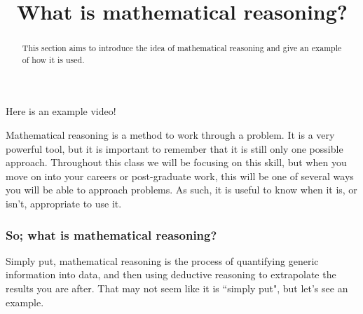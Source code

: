 \documentclass{ximera}
\title{What is mathematical reasoning?}
\begin{document}
\begin{abstract}
    This section aims to introduce the idea of mathematical reasoning and give an example of how it is used.
\end{abstract}
\maketitle

Here is an example video!


Mathematical reasoning is a method to work through a problem. It is a very powerful tool, but it is important to remember that it is still only one possible approach. Throughout this class we will be focusing on this skill, but when you move on into your careers or post-graduate work, this will be one of several ways you will be able to approach problems. As such, it is useful to know when it is, or isn't, appropriate to use it.


\subsubsection*{So; what is mathematical reasoning?}
    Simply put, mathematical reasoning is the process of quantifying generic information into data, and then using deductive reasoning to extrapolate the results you are after. That may not seem like it is ``simply put", but let's see an example.
    
\end{document}
